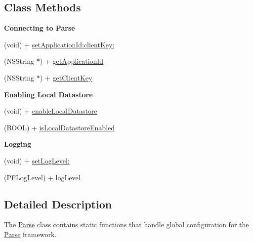 \subsection*{Class Methods}
\begin{Indent}{\bf Connecting to Parse}\par
{\em 

 

 }\begin{DoxyCompactItemize}
\item 
(void) + \hyperlink{interface_parse_a2ab9fb9897adfeef2f15d2a4d17eedc5}{set\+Application\+Id\+:client\+Key\+:}
\item 
(N\+S\+String $\ast$) + \hyperlink{interface_parse_a2518969bfaf490a9e978fce7114401e3}{get\+Application\+Id}
\item 
(N\+S\+String $\ast$) + \hyperlink{interface_parse_aeb25afa48d8c8abc3bb1c7ffabeb7d9a}{get\+Client\+Key}
\end{DoxyCompactItemize}
\end{Indent}
\begin{Indent}{\bf Enabling Local Datastore}\par
{\em 

 

 }\begin{DoxyCompactItemize}
\item 
(void) + \hyperlink{interface_parse_a8495b1c2805002a8bfa825df4018a8df}{enable\+Local\+Datastore}
\item 
(B\+O\+O\+L) + \hyperlink{interface_parse_a0d9fa2b2b00d0c9afe7017d2138dbe30}{is\+Local\+Datastore\+Enabled}
\end{DoxyCompactItemize}
\end{Indent}
\begin{Indent}{\bf Logging}\par
{\em 

 

 }\begin{DoxyCompactItemize}
\item 
(void) + \hyperlink{interface_parse_a2d0d1535297de00a85c1160ee217fb96}{set\+Log\+Level\+:}
\item 
(P\+F\+Log\+Level) + \hyperlink{interface_parse_ae583f0c67f64ed4d0ee77a6b70c05406}{log\+Level}
\end{DoxyCompactItemize}
\end{Indent}


\subsection{Detailed Description}
The {\ttfamily \hyperlink{interface_parse}{Parse}} class contains static functions that handle global configuration for the \hyperlink{interface_parse}{Parse} framework. 

